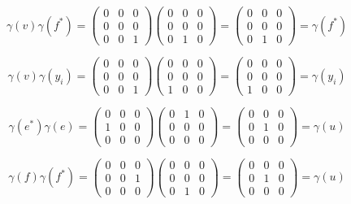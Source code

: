 \begin{solution}
    $$\gamma(v)\gamma(f^*)=
    \left(\begin{array}{ccc} 0 & 0 & 0 \\ 0 & 0 & 0 \\ 0 & 0 & 1 \end{array}\right)
    \left(\begin{array}{ccc} 0 & 0 & 0 \\ 0 & 0 & 0 \\ 0 & 1 & 0 \end{array}\right)
    =\left(\begin{array}{ccc} 0 & 0 & 0 \\ 0 & 0 & 0 \\ 0 & 1 & 0 \end{array}\right)=\gamma(f^*)$$

    $$\gamma(v)\gamma(y_i)=
    \left(\begin{array}{ccc} 0 & 0 & 0 \\ 0 & 0 & 0 \\ 0 & 0 & 1 \end{array}\right)
    \left(\begin{array}{ccc} 0 & 0 & 0 \\ 0 & 0 & 0 \\ 1 & 0 & 0 \end{array}\right)
    =\left(\begin{array}{ccc} 0 & 0 & 0 \\ 0 & 0 & 0 \\ 1 & 0 & 0 \end{array}\right)=\gamma(y_i)$$

    $$\gamma(e^*)\gamma(e)=
    \left(\begin{array}{ccc} 0 & 0 & 0 \\ 1 & 0 & 0 \\ 0 & 0 & 0 \end{array}\right)
    \left(\begin{array}{ccc} 0 & 1 & 0 \\ 0 & 0 & 0 \\ 0 & 0 & 0 \end{array}\right)
    =\left(\begin{array}{ccc} 0 & 0 & 0 \\ 0 & 1 & 0 \\ 0 & 0 & 0 \end{array}\right)=\gamma(u)$$

    $$\gamma(f)\gamma(f^*)=
    \left(\begin{array}{ccc} 0 & 0 & 0 \\ 0 & 0 & 1 \\ 0 & 0 & 0 \end{array}\right)
    \left(\begin{array}{ccc} 0 & 0 & 0 \\ 0 & 0 & 0 \\ 0 & 1 & 0 \end{array}\right)
    =\left(\begin{array}{ccc} 0 & 0 & 0 \\ 0 & 1 & 0 \\ 0 & 0 & 0 \end{array}\right)=\gamma(u)$$


\end{solution}
